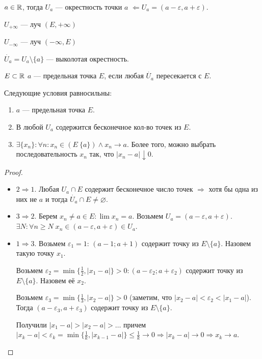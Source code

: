 \begin{definition}
    $a \in \mathbb{R}$, тогда  $U_a$ --- окрестность точки  $a$  $\Leftarrow U_a = (a-\varepsilon, a + \varepsilon)$.
\end{definition}
\begin{definition}
    $U_{+\infty}$ --- луч $(E, +\infty)$
\end{definition}
\begin{definition}
    $U_{-\infty}$ --- луч $(-\infty, E)$
\end{definition}
\begin{definition}
    $\dot{U_a} = U_a \setminus \{a\}$ --- выколотая окрестность.
\end{definition}
\begin{definition}
    $E \subset \mathbb{R}$ $a$ --- предельная точка  $E$, если любая  $\dot{U_a}$ пересекается с  $E$.
\end{definition}
\begin{theorem}
    Следующие условия равносильны:
    \begin{enumerate}
        \item $a$ --- предельная точка  $E$.
        \item В любой  $U_a$ содержится бесконечное кол-во точек из  $E$.
	\item  $\exists \{x_n\}: \forall n: x_n \in (E \ \{a\}) \land x_n \to a$. Более того, можно выбрать последовательность  $x_n$ так, что  $|x_n - a| \downarrow 0$.
    \end{enumerate}
\end{theorem}
\begin{proof}
    \slashn
    \begin{itemize}
        \item $2 \Rightarrow 1$. Любая $U_a \cap E$ содержит бесконечное число точек  $\Rightarrow$ хотя бы одна из них не  $a$ и тогда  $\dot{U_a} \cap E \neq \varnothing$.
        \item $3 \Rightarrow 2$. Берем  $x_n \neq a \in E: \lim x_n = a$. Возьмем  $U_a = (a-\varepsilon, a+\varepsilon)$.  $\exists N: \forall n \ge N\; x_n \in (a - \varepsilon, a + \varepsilon) \in U_a$.
        \item $1 \Rightarrow 3$. Возьмем $\varepsilon_1 = 1$:  $(a-1; a+1)$ содержит точку из $E \setminus \{a\}$. Назовем такую точку $x_1$.

            Возьмем  $\varepsilon_2 = \min\{\frac{1}{2}, |x_1 - a|\} > 0: (a - \varepsilon_2; a + \varepsilon_2)$ содержит точку из $E \setminus \{a\}$. Назовем её  $x_2$.

            Возьмем  $\varepsilon_3 = \min\{\frac{1}{3}, |x_2 - a|\} > 0$ (заметим, что $|x_2 - a| < \varepsilon_2 < |x_1 - a|$). Тогда $(a-\varepsilon_3, a + \varepsilon_3)$ содержит точку из  $E \setminus \{a\}$.

            Получили  $|x_1-a| > |x_2 - a| > \ldots$ причем $|x_k - a| < \varepsilon_k = \min\{\frac{1}{k}, |x_{k-1} - a|\} \le \frac{1}{k} \to 0 \Rightarrow |x_k - a| \to 0 \Rightarrow x_k \to a$. 
    \end{itemize}
\end{proof}
